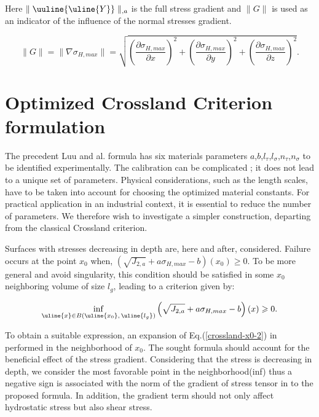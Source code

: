 Here $\parallel \uuline{\uline{Y}}\parallel_{,a}$ is the full stress gradient and $\parallel G\parallel$ is used as an indicator of the influence of the normal stresses gradient.

\begin{equation}
	\parallel{G}\parallel=\parallel{\nabla \sigma_{H,max}}\parallel=\sqrt{\left(\dfrac{\partial \sigma_{H,max}}{\partial x}\right)^2+\left(\dfrac{\partial \sigma_{H,max}}{\partial y}\right)^2+\left(\dfrac{\partial \sigma_{H,max}}{\partial z}\right)^2} .
\end{equation}



\section{Optimized Crossland Criterion formulation}
The precedent Luu and al. formula has six materials parameters $a$,$b$,$l_\tau$,$l_\sigma$,$n_\tau$,$n_\sigma$ to be identified experimentally. The calibration can be complicated ; it does not lead to a unique set of parameters. Physical considerations, such as the length scales, have to be taken into account for choosing the optimized material constants. For practical application in an industrial context, it is essential to reduce the number of parameters. We therefore wish to investigate a simpler construction, departing from the classical Crossland criterion.

Surfaces with stresses decreasing in depth are, here and after, considered. Failure occurs at the point $x_0$ when,  $(\sqrt{J_{2,a}}+a\sigma_{H,max}-b)(x_0)\geqslant 0 $. To be more general and avoid singularity, this condition should be satisfied in some $x_0$ neighboring volume of size $l_g$, leading to a criterion given by:

\begin{equation}
	\inf\limits_{\uline{x}\in B\left( \uline{x_0},\,\uline{l_g}\right) }\left( \sqrt{J_{2,a}}+a\sigma_{H,max}-b\right) (x)\geqslant 0 .
	\label{crossland-x0-2}
\end{equation}

To obtain a suitable expression, an expansion of Eq.(\ref{crossland-x0-2}) in performed in the neighborhood of ${x_0}$. The sought formula should account for the beneficial effect of the stress gradient. Considering that the stress is decreasing in depth, we consider the most favorable point in the neighborhood(inf) thus  a negative sign is associated with the norm of the gradient of stress tensor in to the proposed formula. In addition, the gradient term should not only affect hydrostatic stress but also shear stress.


